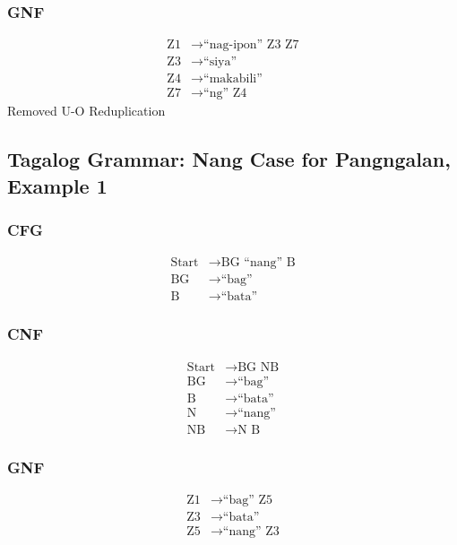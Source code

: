 \subsubsection{GNF}
\begin{equation*}
    \begin{aligned}
        \text{Z1}   & \rightarrow \text{“nag-ipon” Z3 Z7}   \\
        \text{Z3} & \rightarrow \text{“siya”} \\
        \text{Z4} & \rightarrow \text{“makabili”} \\
        \text{Z7} & \rightarrow \text{“ng” Z4}
    \end{aligned}
\end{equation*}Removed U-O Reduplication

\newpage
\subsection{Tagalog Grammar: Nang Case for Pangngalan, Example 1}
\subsubsection{CFG}
\begin{equation*}
    \begin{aligned}
        \text{Start}   & \rightarrow \text{BG “nang” B}   \\
        \text{BG} & \rightarrow \text{“bag”} \\
        \text{B} & \rightarrow \text{“bata”}
    \end{aligned}
\end{equation*}

\subsubsection{CNF}
\begin{equation*}
    \begin{aligned}
        \text{Start}   & \rightarrow \text{BG NB}   \\
        \text{BG} & \rightarrow \text{“bag”} \\
        \text{B} & \rightarrow \text{“bata”} \\
        \text{N} & \rightarrow \text{“nang”} \\
        \text{NB} & \rightarrow \text{N B}
    \end{aligned}
\end{equation*}

\subsubsection{GNF}
\begin{equation*}
    \begin{aligned}
        \text{Z1}   & \rightarrow \text{“bag” Z5}   \\
        \text{Z3} & \rightarrow \text{“bata”} \\
        \text{Z5} & \rightarrow \text{“nang” Z3}
    \end{aligned}
\end{equation*}

